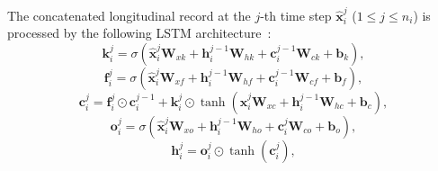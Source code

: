 The concatenated longitudinal record at the $j$-th time step $\hat{\mathbf{x}}_i^j$ ($1 \leq j \leq n_i$) is processed by the following LSTM architecture~\cite{yu2019review}:
\begin{equation}
    \mathbf{k}^j_i = \sigma(\hat{\mathbf{x}}^j_i \mathbf{W}_{xk} + \mathbf{h}_i^{j-1} \mathbf{W}_{hk} + \mathbf{c}_i^{j-1} \mathbf{W}_{ck} + \mathbf{b}_k),
\end{equation}
\begin{equation}
    \mathbf{f}^j_i = \sigma(\hat{\mathbf{x}}^j_i \mathbf{W}_{xf} + \mathbf{h}^{j-1}_i \mathbf{W}_{hf} + \mathbf{c}^{j-1}_i \mathbf{W}_{cf} + \mathbf{b}_f),
\end{equation}
\begin{equation}
    \mathbf{c}^j_i = \mathbf{f}^j_i \odot \mathbf{c}^{j-1}_i + \mathbf{k}^j_i \odot \operatorname{tanh}(\hat{\mathbf{x}}_i^j \mathbf{W}_{xc} + \mathbf{h}^{j - 1}_i \mathbf{W}_{hc} + \mathbf{b}_c),
\end{equation}
\begin{equation}
    \mathbf{o}^j_i = \sigma(\hat{\mathbf{x}}_i^j \mathbf{W}_{xo} + \mathbf{h}^{j-1}_i \mathbf{W}_{ho} + \mathbf{c}^j_i \mathbf{W}_{co} + \mathbf{b}_o),
\end{equation}
\begin{equation}
    \mathbf{h}^j_i = \mathbf{o}^j_i \odot \operatorname{tanh}(\mathbf{c}^j_i),
\end{equation}
